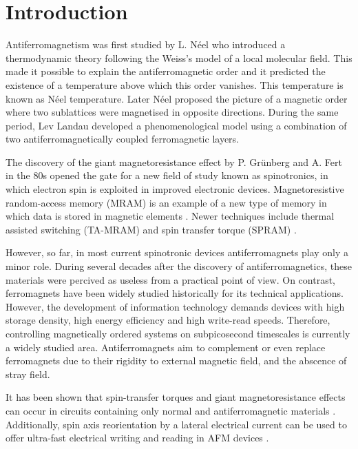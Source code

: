 \chapter{Introduction}
\label{ChapIntro}

Antiferromagnetism was first studied by L. N\'eel who introduced a thermodynamic theory following the Weiss's model of a local molecular field. This made it possible to explain the antiferromagnetic order and it predicted the existence of a temperature above which this order vanishes. This temperature is known as N\'eel temperature. Later N\'eel proposed the picture of a magnetic order where two sublattices were magnetised in opposite directions. During the same period, Lev Landau developed a phenomenological model using a combination of two antiferromagnetically coupled ferromagnetic layers.

The discovery of the giant magnetoresistance effect by P. Grünberg \cite{Binasch1989} and A. Fert \cite{Baibich1988} in the 80s opened the gate for a new field of study known as spinotronics, in which electron spin is exploited in improved electronic devices. Magnetoresistive random-access memory (MRAM) is an example of a new type of memory in which data is stored in magnetic elements \citep{Akerman2005}. Newer techniques include thermal assisted switching (TA-MRAM) \citep{Bandiera2015} and spin transfer torque (SPRAM) \citep{Kawahara2012}.

However, so far, in most current spinotronic devices antiferromagnets play only a minor role. During several decades after the discovery of antiferromagnetics, these materials were percived as useless from a practical point of view. On contrast, ferromagnets have been widely studied historically for its technical applications. However, the development of information technology demands devices with high storage density, high energy efficiency and high write-read speeds. Therefore, controlling magnetically ordered systems on subpicosecond timescales is currently a widely studied area. Antiferromagnets aim to complement or even replace ferromagnets due to their rigidity to external magnetic field, and the abscence of stray field.

It has been shown that spin-transfer torques and giant magnetoresistance effects can occur in circuits containing only normal and antiferromagnetic materials \cite{MacDonald2011}. Additionally, spin axis reorientation by a lateral electrical current can be used to offer ultra-fast electrical writing and reading in AFM devices \cite{Zelezny2014}.

